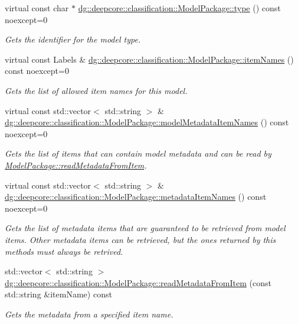 \begin{DoxyCompactItemize}
virtual const char $\ast$ \hyperlink{group___classification_module_ga9f09bd24a91c366c473b9fbb9a59b64a}{dg\+::deepcore\+::classification\+::\+Model\+Package\+::type} () const noexcept=0
\begin{DoxyCompactList}\small\item\em Gets the identifier for the model type. \end{DoxyCompactList}\item 
virtual const Labels \& \hyperlink{group___classification_module_gaa23ae021f838b2836c02dcc626bc1c8e}{dg\+::deepcore\+::classification\+::\+Model\+Package\+::item\+Names} () const noexcept=0
\begin{DoxyCompactList}\small\item\em Gets the list of allowed item names for this model. \end{DoxyCompactList}\item 
virtual const std\+::vector$<$ std\+::string $>$ \& \hyperlink{group___classification_module_ga634f0af2484a3c6de2e8c3a2ff6cea1d}{dg\+::deepcore\+::classification\+::\+Model\+Package\+::model\+Metadata\+Item\+Names} () const noexcept=0
\begin{DoxyCompactList}\small\item\em Gets the list of items that can contain model metadata and can be read by \hyperlink{group___classification_module_gaa50c6f125db866bddba70b958c6a1074}{Model\+Package\+::read\+Metadata\+From\+Item}. \end{DoxyCompactList}\item 
virtual const std\+::vector$<$ std\+::string $>$ \& \hyperlink{group___classification_module_ga6b5ceb1c678e1afe83dbe6e30e82960d}{dg\+::deepcore\+::classification\+::\+Model\+Package\+::metadata\+Item\+Names} () const noexcept=0
\begin{DoxyCompactList}\small\item\em Gets the list of metadata items that are guaranteed to be retrieved from model items. Other metadata items can be retrieved, but the ones returned by this methods must always be retrived. \end{DoxyCompactList}\item 
std\+::vector$<$ std\+::string $>$ \hyperlink{group___classification_module_gaa50c6f125db866bddba70b958c6a1074}{dg\+::deepcore\+::classification\+::\+Model\+Package\+::read\+Metadata\+From\+Item} (const std\+::string \&item\+Name) const 
\begin{DoxyCompactList}\small\item\em Gets the metadata from a specified item name. \end{DoxyCompactList}\item 

\end{DoxyCompactItemize}
